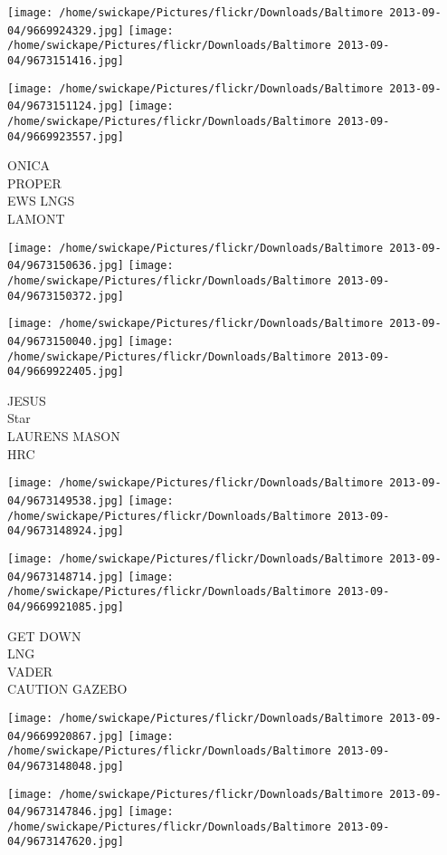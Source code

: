 \documentclass[10pt,letterpaper]{article}
\begin{document}
\texttt{[image: /home/swickape/Pictures/flickr/Downloads/Baltimore 2013-09-04/9669924329.jpg]}
\texttt{[image: /home/swickape/Pictures/flickr/Downloads/Baltimore 2013-09-04/9673151416.jpg]}

\texttt{[image: /home/swickape/Pictures/flickr/Downloads/Baltimore 2013-09-04/9673151124.jpg]}
\texttt{[image: /home/swickape/Pictures/flickr/Downloads/Baltimore 2013-09-04/9669923557.jpg]}

ONICA\\
PROPER\\
EWS LNGS\\
LAMONT
\pagebreak

\texttt{[image: /home/swickape/Pictures/flickr/Downloads/Baltimore 2013-09-04/9673150636.jpg]}
\texttt{[image: /home/swickape/Pictures/flickr/Downloads/Baltimore 2013-09-04/9673150372.jpg]}

\texttt{[image: /home/swickape/Pictures/flickr/Downloads/Baltimore 2013-09-04/9673150040.jpg]}
\texttt{[image: /home/swickape/Pictures/flickr/Downloads/Baltimore 2013-09-04/9669922405.jpg]}

JESUS\\
Star\\
LAURENS MASON\\
HRC
\pagebreak

\texttt{[image: /home/swickape/Pictures/flickr/Downloads/Baltimore 2013-09-04/9673149538.jpg]}
\texttt{[image: /home/swickape/Pictures/flickr/Downloads/Baltimore 2013-09-04/9673148924.jpg]}

\texttt{[image: /home/swickape/Pictures/flickr/Downloads/Baltimore 2013-09-04/9673148714.jpg]}
\texttt{[image: /home/swickape/Pictures/flickr/Downloads/Baltimore 2013-09-04/9669921085.jpg]}

GET DOWN\\
LNG\\
VADER\\
CAUTION GAZEBO
\pagebreak

\texttt{[image: /home/swickape/Pictures/flickr/Downloads/Baltimore 2013-09-04/9669920867.jpg]}
\texttt{[image: /home/swickape/Pictures/flickr/Downloads/Baltimore 2013-09-04/9673148048.jpg]}

\texttt{[image: /home/swickape/Pictures/flickr/Downloads/Baltimore 2013-09-04/9673147846.jpg]}
\texttt{[image: /home/swickape/Pictures/flickr/Downloads/Baltimore 2013-09-04/9673147620.jpg]}
\end{document}
